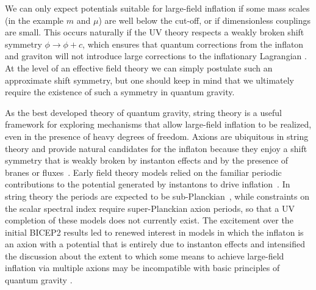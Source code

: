 We can only expect potentials suitable for large-field inflation if some mass scales (in the example $m$ and $\mu$) are well below the cut-off, or if dimensionless couplings are small. This occurs naturally if the UV theory respects a weakly broken shift symmetry $\phi\rightarrow\phi+c$, which ensures that quantum corrections from the inflaton and graviton will not introduce large corrections to the inflationary Lagrangian \cite{Linde:2005ht, Kaloper:2011jz, Csaki:2014bua,Kaplan:2015fuy,Choi:2015fiu}. At the level of an effective field theory we can simply postulate such an approximate shift symmetry, but one should keep in mind that we ultimately require the existence of such a symmetry in quantum gravity. 

As the best developed theory of quantum gravity, string theory is a useful framework for exploring mechanisms that allow large-field inflation to be realized, even in the presence of heavy degrees of freedom. Axions are ubiquitous in string theory and provide natural candidates for the inflaton because they enjoy a shift symmetry that is weakly broken by instanton effects and by the presence of branes or fluxes~\cite{Wen:1985jz}. Early field theory models relied on the familiar periodic contributions to the potential generated by instantons to drive inflation~\cite{Freese:1990rb,Adams:1992bn}. In string theory the periods are expected to be sub-Planckian~\cite{Banks:2003sx,ArkaniHamed:2006dz}, while constraints on the scalar spectral index require super-Planckian axion periods, so that a UV completion of these models does not currently exist. The excitement over the initial { BICEP}2 results \cite{Ade:2014xna} led to renewed interest in models in which the inflaton is an axion with a potential that is entirely due to instanton effects and intensified the discussion about the extent to which some means to achieve large-field inflation via multiple axions may be incompatible with basic principles of quantum gravity \cite{Kim:2004rp,Rudelius:2014wla,delaFuente:2014aca,Rudelius:2015xta,Brown:2015iha,Bachlechner:2015qja,Brown:2015lia,Heidenreich:2015wga,Heidenreich:2015nta,Kooner:2015rza}.

